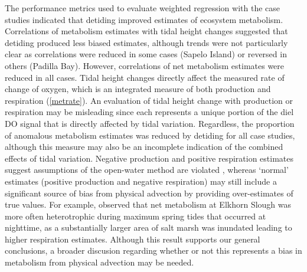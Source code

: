 \documentclass[letterpaper,12pt,oneside]{article}\usepackage[]{graphicx}\usepackage[]{color}
\begin{document}
The performance metrics used to evaluate weighted regression with the case studies indicated that detiding improved estimates of ecosystem metabolism.  Correlations of metabolism estimates with tidal height changes suggested that detiding produced less biased estimates, although trends were not particularly clear as correlations were reduced in some cases (Sapelo Island) or reversed in others (Padilla Bay).  However, correlations of net metabolism estimates were reduced in all cases.  Tidal height changes directly affect the measured rate of change of oxygen, which is an integrated measure of both production and respiration (\cref{metrate}).  An evaluation of tidal height change with production or respiration may be misleading since each represents a unique portion of the diel \ac{DO} signal that is directly affected by tidal variation.  Regardless, the proportion of anomalous metabolism estimates was reduced by detiding for all case studies, although this measure may also be an incomplete indication of the combined effects of tidal variation.  Negative production and positive respiration estimates suggest assumptions of the open-water method are violated \citep{Needoba12}, whereas `normal' estimates (positive production and negative respiration) may still include a significant source of bias from physical advection by providing over-estimates of true values.  For example, \citet{Nidzieko14} observed that net metabolism at Elkhorn Slough was more often heterotrophic during maximum spring tides that occurred at nighttime, as a substantially larger area of salt marsh was inundated leading to higher respiration estimates.  Although this result supports our general conclusions, a broader discusion regarding whether or not this represents a bias in metabolism from physical advection may be needed. 
\end{document}

